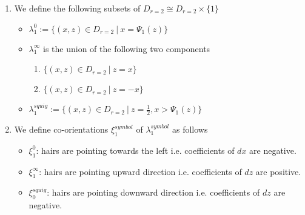\begin{definition}
\begin{enumerate}
\item We define the following subsets of $D_{r=2} \cong D_{r=2}\times \{1\}$
\begin{itemize}
\item $\lambda_1^0 := \{(x,z) \in D_{r=2} ~|~ x = \Psi_1(z)\}$

\item $\lambda_1^\infty$ is the union of the following two components
\begin{enumerate}[label=(\roman*)]
\item $\{(x,z) \in D_{r=2} ~|~ z = x \}$

\item $\{(x,z) \in D_{r=2} ~|~ z = -x \}$
\end{enumerate}

\item $\lambda_1^{squig}:= \{(x,z) \in D_{r=2} ~|~ z=\frac{1}{2}, x > \Psi_1(z) \}$
\end{itemize}

\item We define co-orientations $\xi_1^{symbol}$ of $\lambda_1^{symbol}$ as follows
\begin{itemize}
\item $\xi_1^0$: hairs are pointing towards the left i.e. coefficients of $dx$ are negative.

\item $\xi_1^\infty$: hairs are pointing upward direction i.e. coefficients of $dz$ are positive.

\item $\xi_0^{squig}$: hairs are pointing downward direction i.e. coefficients of $dz$ are negative.

\end{itemize}
\end{enumerate}
\end{definition}

